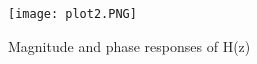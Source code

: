\begin{figure}[H]
    \centering
    \texttt{[image: plot2.PNG]}
   	\caption{Magnitude and phase responses of H(z)}
\end{figure}
  

%
%
%
%    
%
%
%
%
%
%

